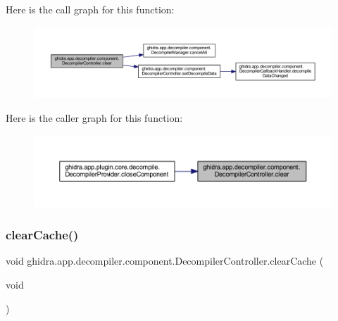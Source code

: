 Here is the call graph for this function\+:
\nopagebreak
\begin{figure}[H]
\begin{center}
\leavevmode
\includegraphics[width=350pt]{classghidra_1_1app_1_1decompiler_1_1component_1_1_decompiler_controller_af8cd025cdb201c8b5e14f52a4357a65d_cgraph}
\end{center}
\end{figure}
Here is the caller graph for this function\+:
\nopagebreak
\begin{figure}[H]
\begin{center}
\leavevmode
\includegraphics[width=350pt]{classghidra_1_1app_1_1decompiler_1_1component_1_1_decompiler_controller_af8cd025cdb201c8b5e14f52a4357a65d_icgraph}
\end{center}
\end{figure}
\mbox{\label{classghidra_1_1app_1_1decompiler_1_1component_1_1_decompiler_controller_a25f18cefdf4ffabb3de1970ebcc110b9}} 
\subsubsection{\texorpdfstring{clearCache()}{clearCache()}}
{\footnotesize\ttfamily void ghidra.\+app.\+decompiler.\+component.\+Decompiler\+Controller.\+clear\+Cache (\begin{DoxyParamCaption}\item[{void}]{ }\end{DoxyParamCaption})\hspace{0.3cm}{\ttfamily [inline]}}



